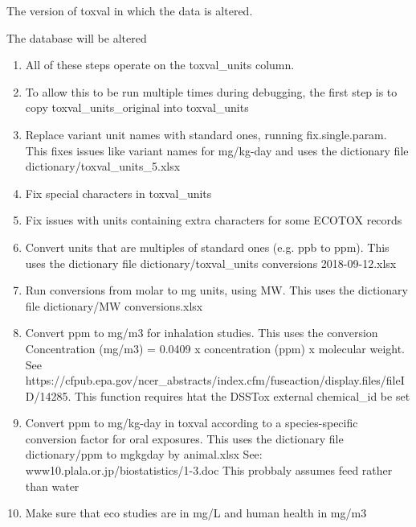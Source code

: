 \documentclass[letterpaper]{book}
\begin{document}
%
\begin{Arguments}
\begin{ldescription}
\item[\code{toxval.db}] The version of toxval in which the data is altered.
\end{ldescription}
\end{Arguments}
%
\begin{Value}
The database will be altered
\end{Value}
%
\begin{Description}\relax
\begin{enumerate}

\item{} All of these steps operate on the toxval\_units column.
\item{} To allow this to be run multiple times during debugging, the first step
is to copy toxval\_units\_original into toxval\_units
\item{} Replace variant unit names with standard ones, running fix.single.param.
This fixes issues like variant names for mg/kg-day and uses the dictionary
file dictionary/toxval\_units\_5.xlsx
\item{} Fix special characters in toxval\_units
\item{} Fix issues with units containing extra characters for some ECOTOX records
\item{} Convert units that are multiples of standard ones (e.g. ppb to ppm). This
uses the dictionary file dictionary/toxval\_units conversions 2018-09-12.xlsx
\item{} Run conversions from molar to mg units, using MW. This uses the dictionary file
dictionary/MW conversions.xlsx
\item{} Convert ppm to mg/m3 for inhalation studies. This uses the conversion Concentration
(mg/m3) = 0.0409 x concentration (ppm) x molecular weight. See
https://cfpub.epa.gov/ncer\_abstracts/index.cfm/fuseaction/display.files/fileID/14285.
This function requires htat the DSSTox external chemical\_id be set
\item{} Convert ppm to mg/kg-day in toxval according to a species-specific
conversion factor for oral exposures. This uses the dictionary file
dictionary/ppm to mgkgday by animal.xlsx
See: www10.plala.or.jp/biostatistics/1-3.doc
This probbaly assumes feed rather than water
\item{} Make sure that eco studies are in mg/L and human health in mg/m3

\end{enumerate}

\end{Description}
\end{document}

